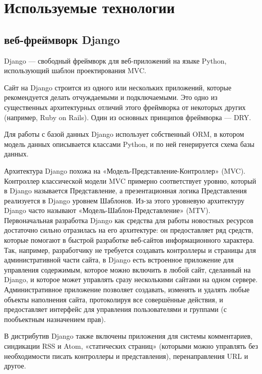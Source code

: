 \lstset{style=fsharpstyle}

\section{Используемые технологии}
\label{sec:practice:technology_used}

\subsection{веб-фреймворк Django}
Django — свободный фреймворк для веб-приложений на языке Python, использующий шаблон проектирования MVC.

Сайт на Django строится из одного или нескольких приложений, которые рекомендуется делать отчуждаемыми и подключаемыми.
Это одно из существенных архитектурных отличий этого фреймворка от некоторых других (например, Ruby on Rails).
Один из основных принципов фреймворка — DRY.

Для работы с базой данных Django использует собственный ORM, в котором модель данных описывается классами Python, и по ней генерируется схема базы данных.

Архитектура Django похожа на «Модель-Представление-Контроллер» (MVC).
Контроллер классической модели MVC примерно соответствует уровню, который в Django называется Представление, а презентационная логика Представления реализуется в Django уровнем Шаблонов.
Из-за этого уровневую архитектуру Django часто называют «Модель-Шаблон-Представление» (MTV).
Первоначальная разработка Django как средства для работы новостных ресурсов достаточно сильно отразилась на его архитектуре: он предоставляет ряд средств, которые помогают в быстрой разработке веб-сайтов информационного характера.
Так, например, разработчику не требуется создавать контроллеры и страницы для административной части сайта, в Django есть встроенное приложение для управления содержимым, которое можно включить в любой сайт, сделанный на Django, и которое может управлять сразу несколькими сайтами на одном сервере.
Административное приложение позволяет создавать, изменять и удалять любые объекты наполнения сайта, протоколируя все совершённые действия, и предоставляет интерфейс для управления пользователями и группами (с пообъектным назначением прав).

В дистрибутив Django также включены приложения для системы комментариев, синдикации RSS и Atom, «статических страниц» (которыми можно управлять без необходимости писать контроллеры и представления), перенаправления URL и другое.

